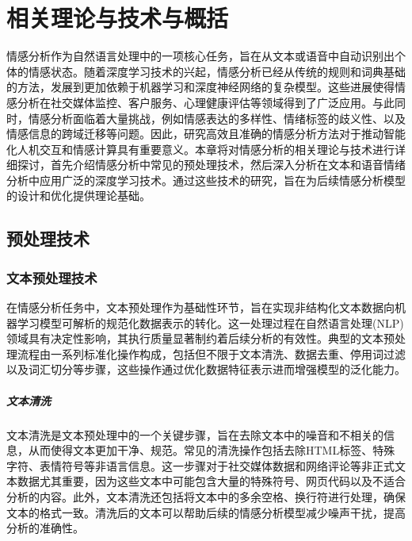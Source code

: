 
\chapter{相关理论与技术与概括}

情感分析作为自然语言处理中的一项核心任务，旨在从文本或语音中自动识别出个体的情感状态。随着深度学习技术的兴起，情感分析已经从传统的规则和词典基础的方法，发展到更加依赖于机器学习和深度神经网络的复杂模型。这些进展使得情感分析在社交媒体监控、客户服务、心理健康评估等领域得到了广泛应用。与此同时，情感分析面临着大量挑战，例如情感表达的多样性、情绪标签的歧义性、以及情感信息的跨域迁移等问题。因此，研究高效且准确的情感分析方法对于推动智能化人机交互和情感计算具有重要意义。本章将对情感分析的相关理论与技术进行详细探讨，首先介绍情感分析中常见的预处理技术，然后深入分析在文本和语音情绪分析中应用广泛的深度学习技术。通过这些技术的研究，旨在为后续情感分析模型的设计和优化提供理论基础。

\section{预处理技术}

\subsection{文本预处理技术}

在情感分析任务中，文本预处理作为基础性环节，旨在实现非结构化文本数据向机器学习模型可解析的规范化数据表示的转化。这一处理过程在自然语言处理(NLP)领域具有决定性影响，其执行质量显著制约着后续分析的有效性。典型的文本预处理流程由一系列标准化操作构成，包括但不限于文本清洗、数据去重、停用词过滤以及词汇切分等步骤，这些操作通过优化数据特征表示进而增强模型的泛化能力。


\paragraph{文本清洗}

文本清洗是文本预处理中的一个关键步骤，旨在去除文本中的噪音和不相关的信息，从而使得文本更加干净、规范。常见的清洗操作包括去除HTML标签、特殊字符、表情符号等非语言信息。这一步骤对于社交媒体数据和网络评论等非正式文本数据尤其重要，因为这些文本中可能包含大量的特殊符号、网页代码以及不适合分析的内容。此外，文本清洗还包括将文本中的多余空格、换行符进行处理，确保文本的格式一致。清洗后的文本可以帮助后续的情感分析模型减少噪声干扰，提高分析的准确性。

